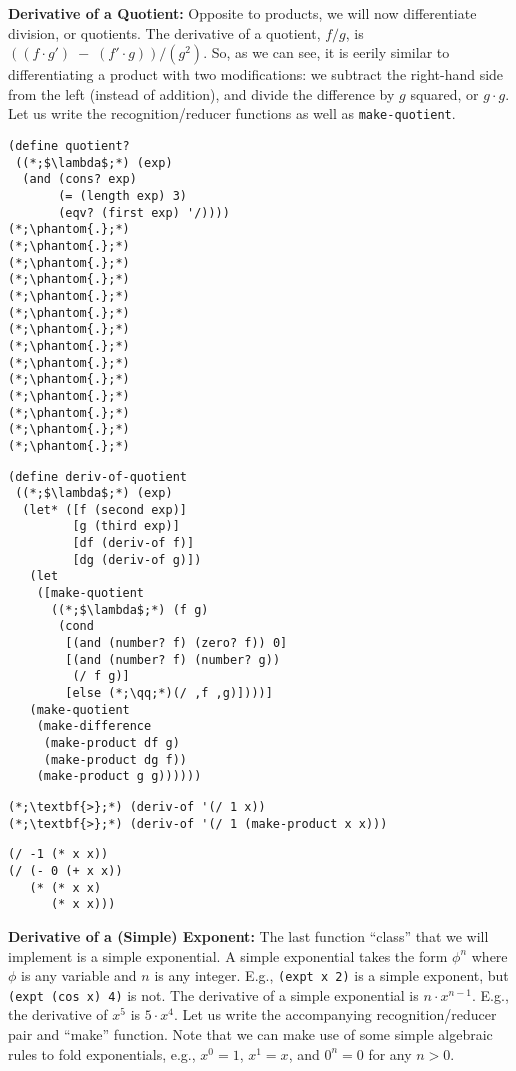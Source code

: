 \textbf{Derivative of a Quotient:}
Opposite to products, we will now differentiate division, or quotients. The derivative of a quotient, $f/g$, is $((f\cdot{g'})\;-\;(f'\cdot{g}))/(g^2)$. So, as we can see, it is eerily similar to differentiating a product with two modifications: we subtract the right-hand side from the left (instead of addition), and divide the difference by $g$ squared, or $g\cdot{g}$. Let us write the recognition/reducer functions as well as \texttt{make-quotient}. 

\begin{clrr}[]{}\begin{lstlisting}[language=MyScheme]
(define quotient?
 ((*;$\lambda$;*) (exp)
  (and (cons? exp)
       (= (length exp) 3)
       (eqv? (first exp) '/))))
(*;\phantom{.};*)
(*;\phantom{.};*)
(*;\phantom{.};*)
(*;\phantom{.};*)
(*;\phantom{.};*)
(*;\phantom{.};*)
(*;\phantom{.};*)
(*;\phantom{.};*)
(*;\phantom{.};*)
(*;\phantom{.};*)
(*;\phantom{.};*)
(*;\phantom{.};*)
(*;\phantom{.};*)
(*;\phantom{.};*)
\end{lstlisting}
\tcblower
\begin{lstlisting}[language=MyNLNScheme]
(define deriv-of-quotient
 ((*;$\lambda$;*) (exp)
  (let* ([f (second exp)]
         [g (third exp)]
         [df (deriv-of f)]
         [dg (deriv-of g)])
   (let
    ([make-quotient
      ((*;$\lambda$;*) (f g)
       (cond
        [(and (number? f) (zero? f)) 0]
        [(and (number? f) (number? g)) 
         (/ f g)]
        [else (*;\qq;*)(/ ,f ,g)])))]
   (make-quotient
    (make-difference 
     (make-product df g)
     (make-product dg f))
    (make-product g g))))))
\end{lstlisting}
\end{clrr}

\begin{cloast}[]{}
\begin{lstlisting}[language=MyNLNScheme]
(*;\textbf{>};*) (deriv-of '(/ 1 x))
(*;\textbf{>};*) (deriv-of '(/ 1 (make-product x x)))
\end{lstlisting}
\tcblower
\begin{lstlisting}[language=MyNLNSOutput]
(/ -1 (* x x))
(/ (- 0 (+ x x)) 
   (* (* x x) 
      (* x x)))
\end{lstlisting}
\end{cloast}

\textbf{Derivative of a (Simple) Exponent:}
The last function ``class'' that we will implement is a simple exponential. A simple exponential takes the form $\phi^n$ where $\phi$ is any variable and $n$ is any integer. E.g., \texttt{(expt x 2)} is a simple exponent, but \texttt{(expt (cos x) 4)} is not. The derivative of a simple exponential is ${n\cdot{x}^{n-1}}$. E.g., the derivative of $x^5$ is $5\cdot{x}^{4}$. Let us write the accompanying recognition/reducer pair and ``make'' function. Note that we can make use of some simple algebraic rules to fold exponentials, e.g., $x^0=1$, $x^1=x$, and $0^n=0$ for any $n>0$. 

